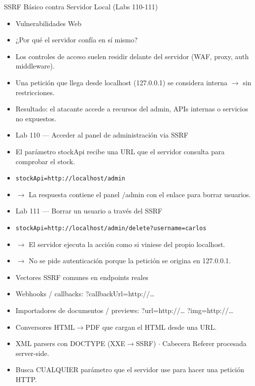 \documentclass[aspectratio=169,10pt]{beamer}
\newcommand{\cmd}[1]{\texttt{\color{uznavy}#1}}
\begin{document}
\begin{frame}[allowframebreaks]{SSRF Básico contra Servidor Local (Labs 110-111)}
\small
  \begin{itemize}
  \item Vulnerabilidades Web
  \item ¿Por qué el servidor confía en sí mismo?
  \item Los controles de acceso suelen residir delante del servidor (WAF, proxy, auth middleware).
  \item Una petición que llega desde localhost (127.0.0.1) se considera interna $\rightarrow$ sin restricciones.
  \item Resultado: el atacante accede a recursos del admin, APIs internas o servicios no expuestos.
  \item Lab 110 --- Acceder al panel de administración via SSRF
  \item El parámetro stockApi recibe una URL que el servidor consulta para comprobar el stock.
  \item \cmd{stockApi=http://localhost/admin}
  \item $\rightarrow$ La respuesta contiene el panel /admin con el enlace para borrar usuarios.
  \item Lab 111 --- Borrar un usuario a través del SSRF
  \item \cmd{stockApi=http://localhost/admin/delete?username=carlos}
  \item $\rightarrow$ El servidor ejecuta la acción como si viniese del propio localhost.
  \item $\rightarrow$ No se pide autenticación porque la petición se origina en 127.0.0.1.
  \item Vectores SSRF comunes en endpoints reales
  \item Webhooks / callbacks: ?callbackUrl=http://\dots{}
  \item Importadores de documentos / previews: ?url=http://\dots{} ?img=http://\dots{}
  \item Conversores HTML$\rightarrow$PDF que cargan el HTML desde una URL.
  \item XML parsers con DOCTYPE (XXE$\rightarrow$SSRF) $\cdot$ Cabecera Referer procesada server-side.
  \item Busca CUALQUIER parámetro que el servidor use para hacer una petición HTTP.
  \end{itemize}
\end{frame}
\end{document}
